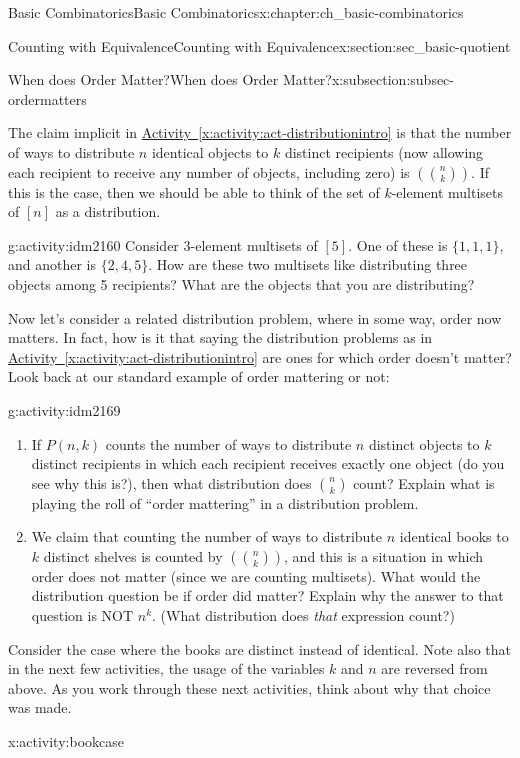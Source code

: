 \documentclass[oneside,10pt,]{book}
\numberwithin{equation}{chapter}
\newcommand{\mchoose}[2]{\left(\!\binom{#1}{#2}\!\right)}
\begin{document}
\begin{chapterptx}{Basic Combinatorics}{}{Basic Combinatorics}{}{}{x:chapter:ch_basic-combinatorics}
\begin{sectionptx}{Counting with Equivalence}{}{Counting with Equivalence}{}{}{x:section:sec_basic-quotient}
\begin{subsectionptx}{When does Order Matter?}{}{When does Order Matter?}{}{}{x:subsection:subsec-ordermatters}
\par
The claim implicit in \hyperref[x:activity:act-distributionintro]{Activity~\ref{x:activity:act-distributionintro}} is that the number of ways to distribute \(n\) identical objects to \(k\) distinct recipients (now allowing each recipient to receive any number of objects, including zero) is \(\mchoose{n}{k}\).  If this is the case, then we should be able to think of the set of \(k\)-element multisets of \([n]\) as a distribution.%
\begin{activity}{}{g:activity:idm2160}%
Consider \(3\)-element multisets of \([5]\).  One of these is \(\{1,1,1\}\), and another is \(\{2,4,5\}\).  How are these two multisets like distributing three objects among 5 recipients?  What are the objects that you are distributing?%
\end{activity}
Now let's consider a related distribution problem, where in some way, order now matters.  In fact, how is it that saying the distribution problems as in \hyperref[x:activity:act-distributionintro]{Activity~\ref{x:activity:act-distributionintro}} are ones for which order doesn't matter?  Look back at our standard example of order mattering or not:%
\begin{activity}{}{g:activity:idm2169}%
\begin{enumerate}[font=\bfseries,label=(\alph*),ref=\alph*]
\item{}If \(P(n,k)\) counts the number of ways to distribute \(n\) distinct objects to \(k\) distinct recipients in which each recipient receives exactly one object (do you see why this is?), then what distribution does \(\binom{n}{k}\) count?  Explain what is playing the roll of ``order mattering'' in a distribution problem.%
\item{}We claim that counting the number of ways to distribute \(n\) identical books to \(k\) distinct shelves is counted by \(\mchoose{n}{k}\), and this is a situation in which order does not matter (since we are counting multisets).  What would the distribution question be if order did matter?  Explain why the answer to that question is NOT \(n^k\). (What distribution does \emph{that} expression count?)%
\end{enumerate}
\end{activity}
Consider the case where the books are distinct instead of identical.  Note also that in the next few activities, the usage of the variables \(k\) and \(n\) are reversed from above.  As you work through these next activities, think about why that choice was made.%
\begin{activity}{}{x:activity:bookcase}%

\end{activity}
\end{subsectionptx}
\end{sectionptx}
\end{chapterptx}
\end{document}
